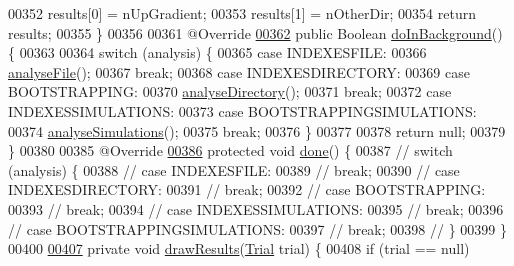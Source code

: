 \begin{DoxyCode}
{00352     results[0] = nUpGradient;
00353     results[1] = nOtherDir;
00354     \textcolor{keywordflow}{return} results;
00355   \}
00356 
00361   @Override
\hypertarget{_chemotaxis_8java_source_l00362}{}\hyperlink{classanalysis_1_1_chemotaxis_ab048bf7b5ce8c46bb48b99b8d0999110}{00362}   \textcolor{keyword}{public} Boolean \hyperlink{classanalysis_1_1_chemotaxis_ab048bf7b5ce8c46bb48b99b8d0999110}{doInBackground}() \{
00363 
00364     \textcolor{keywordflow}{switch} (analysis) \{
00365       \textcolor{keywordflow}{case} INDEXESFILE:
00366         \hyperlink{classanalysis_1_1_chemotaxis_a0b1464e818c4300782cb7e3322448f95}{analyseFile}();
00367         \textcolor{keywordflow}{break};
00368       \textcolor{keywordflow}{case} INDEXESDIRECTORY:
00369       \textcolor{keywordflow}{case} BOOTSTRAPPING:
00370         \hyperlink{classanalysis_1_1_chemotaxis_ad8447fb7554f7f126822c7a3f3f680ce}{analyseDirectory}();
00371         \textcolor{keywordflow}{break};
00372       \textcolor{keywordflow}{case} INDEXESSIMULATIONS:
00373       \textcolor{keywordflow}{case} BOOTSTRAPPINGSIMULATIONS:
00374         \hyperlink{classanalysis_1_1_chemotaxis_ad992aa584aa410ee10b0b5df660c43ec}{analyseSimulations}();
00375         \textcolor{keywordflow}{break};
00376     \}
00377 
00378     \textcolor{keywordflow}{return} null;
00379   \}
00380 
00385   @Override
\hypertarget{_chemotaxis_8java_source_l00386}{}\hyperlink{classanalysis_1_1_chemotaxis_ab650651e4cda2869f73100c6fd2c821a}{00386}   \textcolor{keyword}{protected} \textcolor{keywordtype}{void} \hyperlink{classanalysis_1_1_chemotaxis_ab650651e4cda2869f73100c6fd2c821a}{done}() \{
00387     \textcolor{comment}{// switch (analysis) \{}
00388     \textcolor{comment}{// case INDEXESFILE:}
00389     \textcolor{comment}{// break;}
00390     \textcolor{comment}{// case INDEXESDIRECTORY:}
00391     \textcolor{comment}{// break;}
00392     \textcolor{comment}{// case BOOTSTRAPPING:}
00393     \textcolor{comment}{// break;}
00394     \textcolor{comment}{// case INDEXESSIMULATIONS:}
00395     \textcolor{comment}{// break;}
00396     \textcolor{comment}{// case BOOTSTRAPPINGSIMULATIONS:}
00397     \textcolor{comment}{// break;}
00398     \textcolor{comment}{// \}}
00399   \}
00400 
\hypertarget{_chemotaxis_8java_source_l00407}{}\hyperlink{classanalysis_1_1_chemotaxis_ab864eab3ca8e5147e34d6a4747d24e72}{00407}   \textcolor{keyword}{private} \textcolor{keywordtype}{void} \hyperlink{classanalysis_1_1_chemotaxis_ab864eab3ca8e5147e34d6a4747d24e72}{drawResults}(\hyperlink{classdata_1_1_trial}{Trial} trial) \{
00408     \textcolor{keywordflow}{if} (trial == null)
}
\end{DoxyCode}
